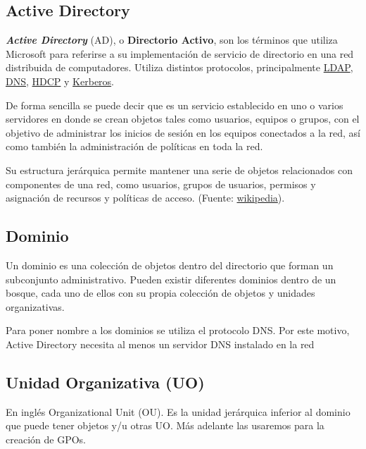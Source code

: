 \subsection{Active Directory}
\textbf{\textit{Active Directory}} (AD), o \textbf{Directorio Activo}, son los términos que utiliza Microsoft para referirse a su implementación de servicio de directorio en una red distribuida de computadores. Utiliza distintos protocolos, principalmente \href{https://es.wikipedia.org/wiki/Protocolo_ligero_de_acceso_a_directorios}{LDAP}, \href{https://es.wikipedia.org/wiki/Sistema_de_nombres_de_dominio}{DNS}, \href{https://es.wikipedia.org/wiki/Protocolo_de_configuraci%C3%B3n_din%C3%A1mica_de_host}{HDCP} y \href{https://es.wikipedia.org/wiki/Kerberos}{Kerberos}.

De forma sencilla se puede decir que es un servicio establecido en uno o varios servidores en donde se crean objetos tales como usuarios, equipos o grupos, con el objetivo de administrar los inicios de sesión en los equipos conectados a la red, así como también la administración de políticas en toda la red.

Su estructura jerárquica permite mantener una serie de objetos relacionados con componentes de una red, como usuarios, grupos de usuarios, permisos y asignación de recursos y políticas de acceso. (Fuente: \href{https://es.wikipedia.org/wiki/Active_Directory}{wikipedia}).


\subsection{Dominio}
Un dominio es una colección de objetos dentro del directorio que forman un subconjunto administrativo. Pueden existir diferentes dominios dentro de un bosque, cada uno de ellos con su propia colección de objetos y unidades organizativas.

Para poner nombre a los dominios se utiliza el protocolo DNS. Por este motivo, Active Directory necesita al menos un servidor DNS instalado en la red

\subsection{Unidad Organizativa (UO)}
En inglés Organizational Unit (OU). Es la unidad jerárquica inferior al dominio que puede tener objetos y/u otras UO. Más adelante las usaremos para la creación de GPOs.



